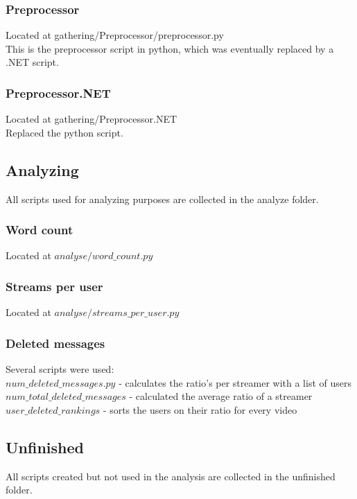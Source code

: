 \documentclass[final]{report} %
\begin{document}
\begin{appendices}
\subsubsection{Preprocessor}
\label{script:preprocessor}
Located at gathering/Preprocessor/preprocessor.py\\
This is the preprocessor script in python, which was eventually replaced by a .NET script.

\subsubsection{Preprocessor.NET}
\label{script:preprocessor.NET}
Located at gathering/Preprocessor.NET\\
Replaced the python script.

\subsection{Analyzing}
All scripts used for analyzing purposes are collected in the analyze folder.
\subsubsection{Word count}
\label{script:word_count}
Located at $analyse/word\_count.py$\\

\subsubsection{Streams per user}
\label{script:streams_per_user}
Located at $analyse/streams\_per\_user.py$\\

\subsubsection{Deleted messages}
\label{script:deleted_messages}
Several scripts were used:\\
$num\_deleted\_messages.py$ - calculates the ratio's per streamer with a list of users\\
$num\_total\_deleted\_messages$ - calculated the average ratio of a streamer\\
$user\_deleted\_rankings$ - sorts the users on their ratio for every video\\

\subsection{Unfinished}
All scripts created but not used in the analysis are collected in the unfinished folder.


\end{appendices}
\end{document}
